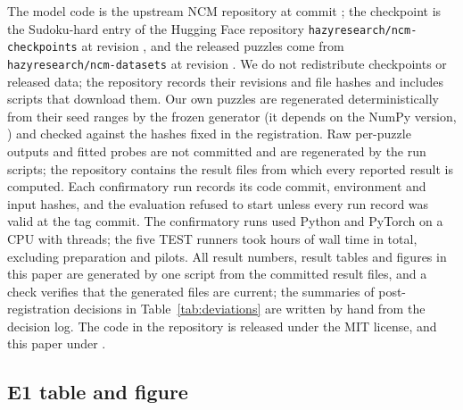  The model code is the upstream NCM repository at commit \texttt{}; the checkpoint is the Sudoku-hard entry of the Hugging Face repository \texttt{hazyresearch/ncm-checkpoints} at revision \texttt{}, and the released puzzles come from \texttt{hazyresearch/ncm-datasets} at revision \texttt{}. We do not redistribute checkpoints or released data; the repository records their revisions and file hashes and includes scripts that download them. Our own puzzles are regenerated deterministically from their seed ranges by the frozen generator (it depends on the NumPy version, ) and checked against the hashes fixed in the registration. Raw per-puzzle outputs and fitted probes are not committed and are regenerated by the run scripts; the repository contains the result files from which every reported result is computed. Each confirmatory run records its code commit, environment and input hashes, and the evaluation refused to start unless every run record was valid at the tag commit. The confirmatory runs used Python  and PyTorch  on a CPU with  threads; the five TEST runners took  hours of wall time in total, excluding preparation and pilots. All result numbers, result tables and figures in this paper are generated by one script from the committed result files, and a check verifies that the generated files are current; the summaries of post-registration decisions in Table~\ref{tab:deviations} are written by hand from the decision log. The code in the repository is released under the MIT license, and this paper under \paperlicence.

\clearpage
\subsection{E1 table and figure}
\label{sec:appendix-e1}

